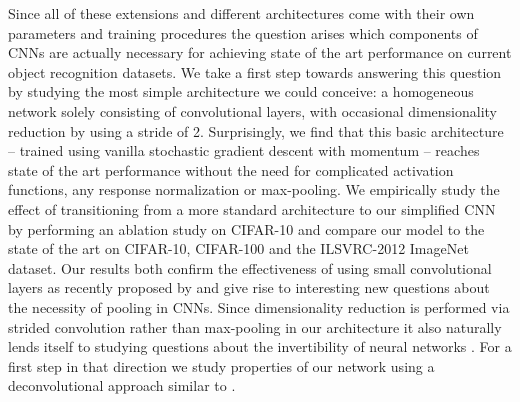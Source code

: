 \documentclass{article} %
\begin{document}
Since all of these extensions and different architectures come with
their own parameters and training procedures the question arises which
components of CNNs are actually  necessary for achieving
state of the art performance on current object recognition datasets.
We take a first step towards answering this question by
studying the most simple architecture we could conceive: a homogeneous network
solely consisting of convolutional layers, with occasional
dimensionality reduction by using a stride of 2. Surprisingly, we
find that this basic architecture -- trained using vanilla stochastic
gradient descent with momentum -- reaches state of the art
performance without the need
for complicated activation functions, any response normalization or max-pooling. We empirically study
the effect of transitioning from a more standard architecture to our
simplified CNN by performing an ablation study on CIFAR-10 and compare
our model to the state of the art on CIFAR-10, CIFAR-100 and the
ILSVRC-2012 ImageNet dataset. Our results both confirm the effectiveness
of using small convolutional layers as recently proposed by \citet{VGG_2014} and give rise to interesting new
questions about the necessity of pooling in CNNs. Since dimensionality
reduction is performed via strided convolution rather than max-pooling in our
architecture it also naturally lends itself to studying questions about the
invertibility of neural networks \citep{Estrach_2014}. For a first step in
that direction we study properties of our network using a
deconvolutional approach similar to \citet{Zeiler_ECCV2014}.

\end{document}
